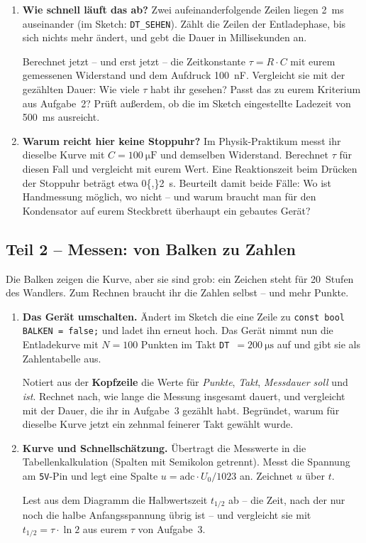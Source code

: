 \documentclass[a4paper,12pt]{scrartcl}
\begin{document}
\begin{enumerate}[leftmargin=2em, resume, itemsep=13pt, topsep=10pt]
\item \textbf{Wie schnell läuft das ab?} Zwei aufeinanderfolgende Zeilen liegen
\SI{2}{\milli\second} auseinander (im Sketch: \texttt{DT\_SEHEN}). Zählt die Zeilen der
Entladephase, bis sich nichts mehr ändert, und gebt die Dauer in Millisekunden an.

\smallskip
Berechnet jetzt -- und erst jetzt -- die Zeitkonstante $\tau = R\cdot C$ mit eurem gemessenen
Widerstand und dem Aufdruck \SI{100}{\nano\farad}. Vergleicht sie mit der gezählten Dauer:
Wie viele $\tau$ habt ihr gesehen? Passt das zu eurem Kriterium aus Aufgabe~2? Prüft außerdem,
ob die im Sketch eingestellte Ladezeit von \SI{500}{\milli\second} ausreicht.

\item \textbf{Warum reicht hier keine Stoppuhr?} Im Physik-Praktikum messt ihr dieselbe Kurve mit
$C=\SI{100}{\micro\farad}$ und demselben Widerstand. Berechnet $\tau$ für diesen Fall und
vergleicht mit eurem Wert. Eine Reaktionszeit beim Drücken der Stoppuhr beträgt etwa
\SI{0{,}2}{\second}. Beurteilt damit beide Fälle: Wo ist Handmessung möglich, wo nicht -- und
warum braucht man für den Kondensator auf eurem Steckbrett überhaupt ein gebautes Gerät?
\end{enumerate}

\subsection*{Teil 2 -- Messen: von Balken zu Zahlen}

\noindent Die Balken zeigen die Kurve, aber sie sind grob: ein Zeichen steht für 20~Stufen des
Wandlers. Zum Rechnen braucht ihr die Zahlen selbst -- und mehr Punkte.

\begin{enumerate}[leftmargin=2em, resume, itemsep=13pt, topsep=9pt]
\item \textbf{Das Gerät umschalten.} Ändert im Sketch die eine Zeile zu
\texttt{const bool BALKEN = false;} und ladet ihn erneut hoch. Das Gerät nimmt nun die
Entladekurve mit $N=100$ Punkten im Takt \texttt{DT}~$=\SI{200}{\micro\second}$ auf und gibt sie
als Zahlentabelle aus.

\smallskip
Notiert aus der \textbf{Kopfzeile} die Werte für \emph{Punkte}, \emph{Takt},
\emph{Messdauer soll} und \emph{ist}. Rechnet nach, wie lange die Messung insgesamt dauert, und
vergleicht mit der Dauer, die ihr in Aufgabe~3 gezählt habt. Begründet, warum für dieselbe Kurve
jetzt ein zehnmal feinerer Takt gewählt wurde.

\item \textbf{Kurve und Schnellschätzung.} Übertragt die Messwerte in die Tabellenkalkulation
(Spalten mit Semikolon getrennt). Messt die Spannung am \texttt{5V}-Pin und legt eine Spalte
$u = \text{adc}\cdot U_0/1023$ an. Zeichnet $u$ über $t$.

\smallskip
Lest aus dem Diagramm die Halbwertszeit $t_{1/2}$ ab -- die Zeit, nach der nur noch die halbe
Anfangsspannung übrig ist -- und vergleicht sie mit $t_{1/2}=\tau\cdot\ln 2$ aus eurem $\tau$
von Aufgabe~3.
\end{enumerate}
\end{document}
